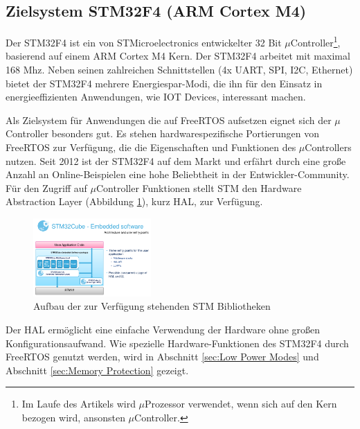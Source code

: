 \subsection{Zielsystem STM32F4 (ARM Cortex M4)}
\label{sec:Zielsysteme}
Der STM32F4 ist ein von STMicroelectronics entwickelter 32 Bit $\mu$Controller\footnote{Im Laufe des Artikels wird $\mu$Prozessor verwendet, wenn sich auf den Kern bezogen wird, ansonsten $\mu$Con\-trol\-ler.}, basierend auf einem ARM Cortex M4 Kern. Der STM32F4 arbeitet mit maximal 168 Mhz. Neben seinen zahlreichen Schnittstellen (4x UART, SPI, I2C, Ethernet) bietet der STM32F4 mehrere Energiespar-Modi, die ihn für den Einsatz in energieeffizienten Anwendungen, wie IOT Devices, interessant machen. 

Als Zielsystem für Anwendungen die auf FreeRTOS aufsetzen eignet sich der $\mu$Controller besonders gut. Es stehen hardwarespezifische Portierungen von FreeRTOS zur Verfügung, die die Eigenschaften und Funktionen des $\mu$Con\-trol\-lers nutzen.     
Seit 2012 ist der STM32F4 auf dem Markt und erfährt durch eine große Anzahl an Online-Beispielen eine hohe Beliebtheit in der Entwickler-Community. Für den Zugriff auf $\mu$Controller Funktionen stellt STM den Hardware Abstraction Layer (Abbildung \ref{fig:HAL}), kurz HAL, zur Ver\-fü\-gung.      
\begin{figure}[htb!]
	\centering
		\includegraphics[width=0.4\textwidth]{Pictures/STM32F4/LibraryEntry.png}
	\caption{Aufbau der zur Verfügung stehenden STM Bibliotheken }
	\label{fig:HAL}
\end{figure}
\newline
Der HAL ermöglicht eine einfache Verwendung der Hardware ohne großen Konfigurationsaufwand. Wie spezielle Hardware-Funktionen des STM32F4 durch FreeRTOS genutzt werden, wird in Abschnitt \ref{sec:Low Power Modes} und Abschnitt \ref{sec:Memory Protection} gezeigt.